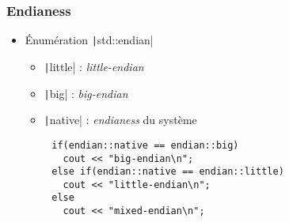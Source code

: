 \documentclass[C++.tex]{subfiles}
\begin{document}
\begin{frame}[fragile]
	\frametitle{Endianess}
	\begin{itemize}
		\item Énumération \texttt|std::endian|
		\begin{itemize}
			\item \texttt|little| : \textit{little-endian}
			\item \texttt|big| : \textit{big-endian}
			\item \texttt|native| : \textit{endianess} du système
		\end{itemize}
	\end{itemize}

	\begin{verbatim}
		if(endian::native == endian::big)
		  cout << "big-endian\n";
		else if(endian::native == endian::little)
		  cout << "little-endian\n";
		else
		  cout << "mixed-endian\n";
	\end{verbatim}


\end{frame}
\end{document}

